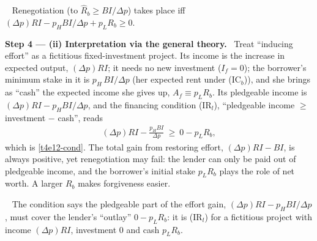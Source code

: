 \documentclass[11pt,a4paper]{article}
\newcommand{\step}[2]{\par\medskip\noindent\textbf{Step #1 --- #2.}~}
\newcommand{\answer}[1]{\par\smallskip\noindent\fbox{\textbf{Answer #1.}}~}
\begin{document}
\answer{(i)} Renegotiation (to $\hat R_b\ge BI/\Delta p$) takes place iff
$(\Delta p)RI-p_HBI/\Delta p+p_LR_b\ge0$.

\step{4}{(ii) Interpretation via the general theory} Treat ``inducing effort'' as a fictitious
fixed-investment project. Its income is the increase in expected output, $(\Delta p)RI$; it needs no
new investment ($I_f=0$); the borrower's minimum stake in it is $p_H\,BI/\Delta p$ (her expected rent
under (IC$_b$)), and she brings as ``cash'' the expected income she gives up, $A_f\equiv p_LR_b$. Its
pledgeable income is $(\Delta p)RI-p_HBI/\Delta p$, and the financing condition (IR$_l$),
``pledgeable income $\ge$ investment $-$ cash'', reads
\begin{align}
  (\Delta p)RI-\frac{p_HBI}{\Delta p} \ \ge\ 0-p_LR_b, \label{t4e12-fict}
\end{align}
which is \eqref{t4e12-cond}. The total gain from restoring effort, $(\Delta p)RI-BI$, is always positive,
yet renegotiation may fail: the lender can only be paid out of pledgeable income, and the borrower's
initial stake $p_LR_b$ plays the role of net worth. A larger $R_b$ makes forgiveness easier.

\answer{(ii)} The condition says the pledgeable part of the effort gain, $(\Delta p)RI-p_HBI/\Delta p$,
must cover the lender's ``outlay'' $0-p_LR_b$: it is (IR$_l$) for a fictitious project with income
$(\Delta p)RI$, investment $0$ and cash $p_LR_b$.
\end{document}
